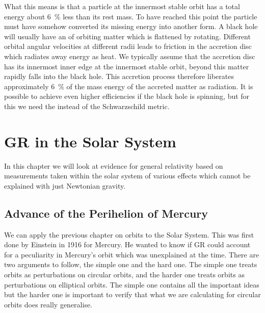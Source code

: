 \documentclass[fleqn]{NotesClass}
\begin{document}
    What this means is that a particle at the innermost stable orbit has a total energy about \qty{6}{\percent} less than its rest mass.
    To have reached this point the particle must have somehow converted its missing energy into another form.
    A black hole will usually have an  of orbiting matter which is flattened by rotating.
    Different orbital angular velocities at different radii leads to friction in the accretion disc which radiates away energy as heat.
    We typically assume that the accretion disc has its innermost inner edge at the innermost stable orbit, beyond this matter rapidly falls into the black hole.
    This accretion process therefore liberates approximately \qty{6}{\percent} of the mass energy of the accreted matter as radiation.
    It is possible to achieve even higher efficiencies if the black hole is spinning, but for this we need the  instead of the Schwarzschild metric.
    
    \chapter{GR in the Solar System}
    In this chapter we will look at evidence for general relativity based on measurements taken within the solar system of various effects which cannot be explained with just Newtonian gravity.
    
    \section{Advance of the Perihelion of Mercury}
    We can apply the previous chapter on orbits to the Solar System.
    This was first done by Einstein in 1916 for Mercury.
    He wanted to know if GR could account for a peculiarity in Mercury's orbit which was unexplained at the time.
    There are two arguments to follow, the simple one and the hard one.
    The simple one treats orbits as perturbations on circular orbits, and the harder one treats orbits as perturbations on elliptical orbits.
    The simple one contains all the important ideas but the harder one is important to verify that what we are calculating for circular orbits does really generalise.
    
\end{document}
